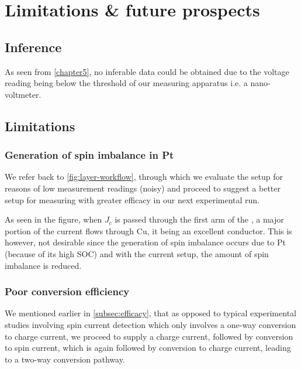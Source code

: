 \chapter{Limitations \& future prospects}

\label{chapter6}

\section{Inference}

As seen from \cref{chapter5}, no inferable data could be obtained due to the voltage reading being below the threshold of our measuring apparatus i.e. a nano-voltmeter.

\section{Limitations}


\subsection{Generation of spin imbalance in Pt}

We refer back to \cref{fig:layer-workflow}, through which we evaluate the setup for reasons of low measurement readings (noisy) and proceed to suggest a better setup for measuring with greater efficacy in our next experimental run.

As seen in the figure, when \( J_c \) is passed through the first arm of the \Hst, a major portion of the current flows through Cu, it being an excellent conductor.
This is however, not desirable since the generation of spin imbalance occurs due to Pt (because of its high SOC) and with the current setup, the amount of spin imbalance is reduced.


\subsection{Poor conversion efficiency}

We mentioned earlier in \cref{subsec:efficacy}, that as opposed to typical experimental studies involving spin current detection which only involves a one-way conversion to charge current, we proceed to supply a charge current, followed by conversion to spin current, which is again followed by conversion to charge current, leading to a two-way conversion pathway.

